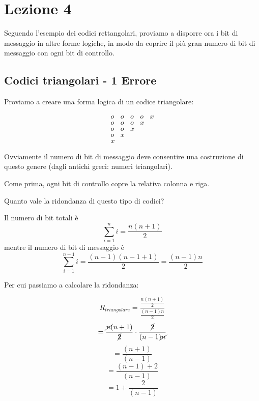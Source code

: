 \section*{Lezione 4}

Seguendo l'esempio dei codici rettangolari, proviamo a disporre ora i bit di messaggio in altre forme logiche, in modo da coprire il più gran numero di bit di messaggio con ogni bit di controllo.

\subsection*{Codici triangolari - 1 Errore}
Proviamo a creare una forma logica di un codice triangolare:

\begin{equation*}
\begin{matrix}
\textit{o} & \textit{o} & \textit{o} & \textit{o} & x\\
\textit{o} & \textit{o} & \textit{o} & x\\
\textit{o} & \textit{o} & x\\
\textit{o} & x\\
x
\end{matrix}
\end{equation*}

Ovviamente il numero di bit di messaggio deve consentire una costruzione di questo genere (dagli antichi greci: numeri triangolari).

Come prima, ogni bit di controllo copre la relativa colonna e riga.

Quanto vale la ridondanza di questo tipo di codici?

Il numero di bit totali è 
\begin{equation}
\sum_{i=1}^{n}i = \frac{n(n+1)}{2}
\end{equation}
mentre il numero di bit di messaggio è
\begin{equation}
\sum_{i=1}^{n-1}i = \frac{(n-1)(n-1+1)}{2} = \frac{(n-1)n}{2}
\end{equation}

Per cui passiamo a calcolare la ridondanza:

\begin{equation}
R_{triangolare} = \frac{\frac{n(n+1)}{2}}{\frac{(n-1)n}{2}}
\end{equation}
\begin{equation*}
= \frac{\cancel{n}(n+1)}{\cancel{2}} \cdot \frac{\cancel{2}}{(n-1)\cancel{n}}
\end{equation*}
\begin{equation*}
= \frac{(n+1)}{(n-1)}
\end{equation*}
\begin{equation*}
= \frac{(n-1) + 2}{(n-1)}
\end{equation*}
\begin{equation*}
= 1 + \frac{2}{(n-1)}
\end{equation*}

